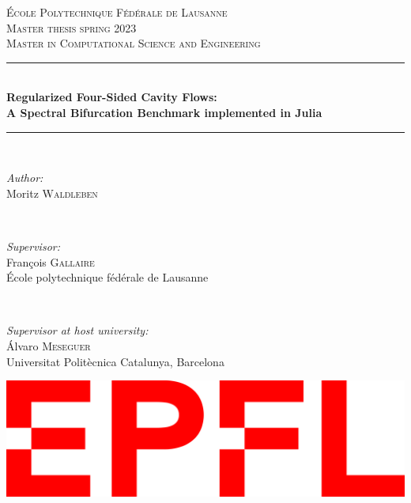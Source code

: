 \begin{titlepage}
\newcommand{\HRule}{\rule{\linewidth}{0.5mm}}

\center
 

\vspace{3cm}
\textsc{\LARGE École Polytechnique Fédérale de Lausanne}\\[1.5cm]
\textsc{\Large Master thesis spring 2023}\\[0.5cm]
\textsc{\large Master in Computational Science and Engineering}\\[0.5cm]


\HRule \\[0.4cm]
{ \huge \bfseries  Regularized Four-Sided Cavity Flows:\\ A Spectral
  Bifurcation Benchmark implemented in Julia}\\[0.4cm]
\HRule \\[1.5cm]
 

\begin{flushleft} \large
\emph{Author:} \\
Moritz \textsc{Waldleben}
\end{flushleft}
~
\begin{flushleft} \large
\emph{Supervisor:} \\ 
François \textsc{Gallaire} \\
École polytechnique fédérale de Lausanne
\end{flushleft}
~
\begin{flushleft} \large
\emph{Supervisor at host university:} \\
Álvaro \textsc{Meseguer} \\
Universitat Politècnica Catalunya, Barcelona
\end{flushleft}

\vspace{7cm}


\begin{center}
\includegraphics[width=0.3\linewidth]{figs/logo_epfl}\\[1cm]
\end{center}
 

\vfill

\end{titlepage}
